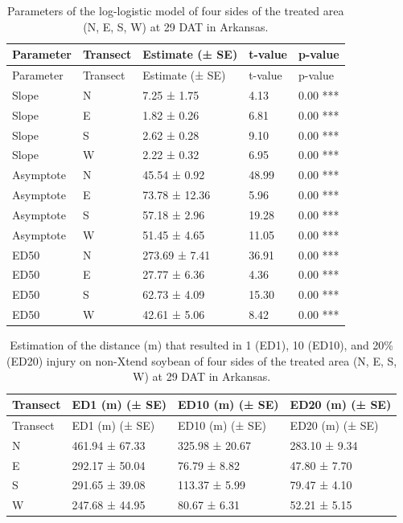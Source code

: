 \documentclass[]{article}
\begin{document}
\begin{longtable}[]{@{}lllll@{}}
\caption{Parameters of the log-logistic model of four sides of the
treated area (N, E, S, W) at 29 DAT in Arkansas.}\tabularnewline
\toprule
Parameter & Transect & Estimate (± SE) & t-value &
p-value\tabularnewline
\midrule
\endfirsthead
\toprule
Parameter & Transect & Estimate (± SE) & t-value &
p-value\tabularnewline
\midrule
\endhead
Slope & N & 7.25 ± 1.75 & 4.13 & 0.00 ***\tabularnewline
Slope & E & 1.82 ± 0.26 & 6.81 & 0.00 ***\tabularnewline
Slope & S & 2.62 ± 0.28 & 9.10 & 0.00 ***\tabularnewline
Slope & W & 2.22 ± 0.32 & 6.95 & 0.00 ***\tabularnewline
Asymptote & N & 45.54 ± 0.92 & 48.99 & 0.00 ***\tabularnewline
Asymptote & E & 73.78 ± 12.36 & 5.96 & 0.00 ***\tabularnewline
Asymptote & S & 57.18 ± 2.96 & 19.28 & 0.00 ***\tabularnewline
Asymptote & W & 51.45 ± 4.65 & 11.05 & 0.00 ***\tabularnewline
ED50 & N & 273.69 ± 7.41 & 36.91 & 0.00 ***\tabularnewline
ED50 & E & 27.77 ± 6.36 & 4.36 & 0.00 ***\tabularnewline
ED50 & S & 62.73 ± 4.09 & 15.30 & 0.00 ***\tabularnewline
ED50 & W & 42.61 ± 5.06 & 8.42 & 0.00 ***\tabularnewline
\bottomrule
\end{longtable}

\begin{longtable}[]{@{}llll@{}}
\caption{Estimation of the distance (m) that resulted in 1 (ED1), 10
(ED10), and 20\% (ED20) injury on non-Xtend soybean of four sides of the
treated area (N, E, S, W) at 29 DAT in Arkansas.}\tabularnewline
\toprule
Transect & ED1 (m) (± SE) & ED10 (m) (± SE) & ED20 (m) (±
SE)\tabularnewline
\midrule
\endfirsthead
\toprule
Transect & ED1 (m) (± SE) & ED10 (m) (± SE) & ED20 (m) (±
SE)\tabularnewline
\midrule
\endhead
N & 461.94 ± 67.33 & 325.98 ± 20.67 & 283.10 ± 9.34\tabularnewline
E & 292.17 ± 50.04 & 76.79 ± 8.82 & 47.80 ± 7.70\tabularnewline
S & 291.65 ± 39.08 & 113.37 ± 5.99 & 79.47 ± 4.10\tabularnewline
W & 247.68 ± 44.95 & 80.67 ± 6.31 & 52.21 ± 5.15\tabularnewline
\bottomrule
\end{longtable}

\newpage
\end{document}
